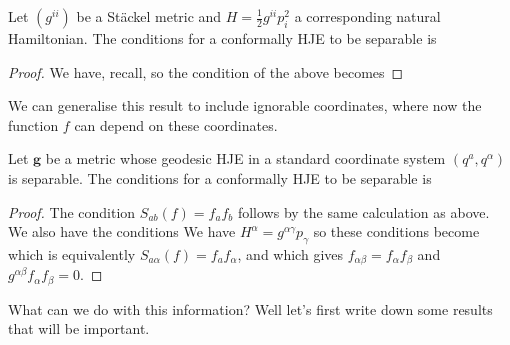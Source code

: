 \documentclass{article}
\begin{document}
\begin{lemma}
	Let $(g^{ii})$ be a St\"ackel metric and $H = \frac{1}{2}g^{ii}p_i^2$ a corresponding natural Hamiltonian. The conditions for a conformally HJE to be separable is 
\end{lemma}
\begin{proof}
	We have, recall, 
so the condition of the above becomes 
\end{proof}

We can generalise this result to include ignorable coordinates, where now the function $f$ can depend on these coordinates. 

\begin{prop}
	Let $\bm{g}$ be a metric whose geodesic HJE in a standard coordinate system $(q^a,q^\alpha)$ is separable. The conditions for a conformally HJE to be separable is 
\end{prop}
\begin{proof}
	The condition $S_{ab}(f) = f_a f_b$ follows by the same calculation as above. We also have the conditions 
We have $H^\alpha = g^{\alpha\gamma}p_\gamma$ so these conditions become 
which is equivalently $S_{a\alpha}(f) = f_a f_\alpha$, and 
which gives $f_{\alpha\beta}=f_\alpha f_\beta$ and $g^{\alpha\beta}f_{\alpha} f_\beta=0$.
\end{proof}

What can we do with this information? Well let's first write down some results that will be important. 
\end{document}
